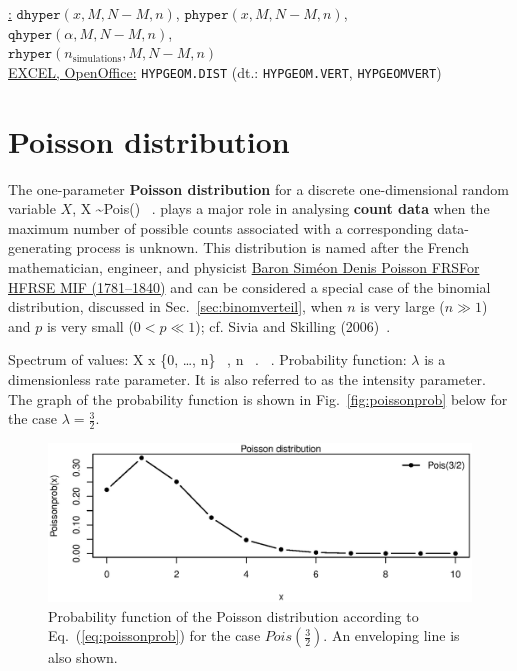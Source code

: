 \medskip
\noindent
\underline{\R:} $\texttt{dhyper}(x,M,N-M,n)$,
$\texttt{phyper}(x,M,N-M,n)$,
$\texttt{qhyper}(\alpha,M,N-M,n)$, \\
$\texttt{rhyper}(n_{\mathrm{simulations}},M,N-M,n)$ \\
\underline{EXCEL, OpenOffice:} \texttt{HYPGEOM.DIST}
(dt.: \texttt{HYPGEOM.VERT}, \texttt{HYPGEOMVERT})

\section[Poisson distribution]{Poisson distribution}
The one-parameter \textbf{Poisson distribution} for a discrete 
one-dimensional random variable $X$,
%
\be
X \sim Pois(\lambda) \ .
\ee
%
plays a major role in analysing \textbf{count data} when the
maximum number of possible counts associated with a corresponding
data-generating process is unknown. This distribution is named
after the French mathematician, engineer, and physicist 
\href{http://www-history.mcs.st-and.ac.uk/Biographies/Poisson.html}{Baron
Sim\'{e}on Denis Poisson FRSFor HFRSE MIF (1781--1840)} and can be
considered a special case of the binomial distribution, discussed
in Sec.~\ref{sec:binomverteil}, when $n$ is very large ($n \gg 1$)
and $p$ is very small ($0 < p \ll 1$); cf. Sivia and Skilling
(2006)~.

\medskip
\noindent
Spectrum of values:
%
\be
X \mapsto x \in \left\{0, \ldots, n\right\} \ , 
\quad\quad{}\quad n \in {} \ . \ .
\ee
%
Probability function:
%
\be
{}
\ee
%
$\lambda$ is a dimensionless rate parameter. It is also  referred
to as the intensity parameter. The graph of the probability
function is shown in Fig.~\ref{fig:poissonprob} below for the case
$\displaystyle\lambda=\frac{3}{2}$.
%
\begin{figure}[!htb]
\begin{center}
\includegraphics[scale=0.8]{poissonprob.eps}
\end{center}
\caption{Probability function of the Poisson distribution 
according to Eq.~(\ref{eq:poissonprob}) for the case 
$\displaystyle Pois\left(\frac{3}{2}\right)$. An enveloping line is
also shown.}
\end{figure}
%

